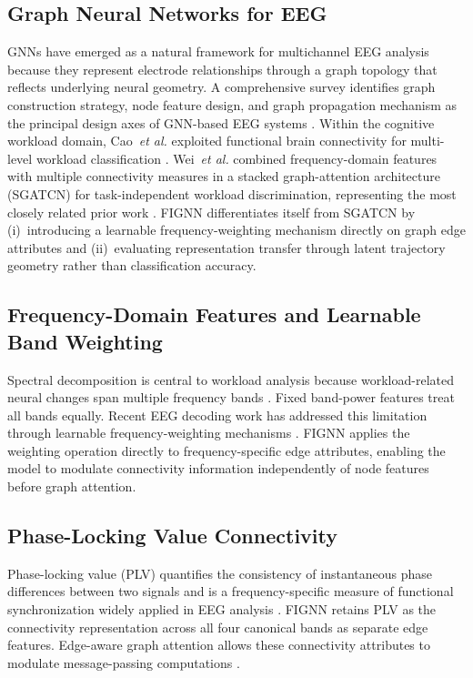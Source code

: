 \documentclass{ieeeaccess}
\begin{document}
\subsection{Graph Neural Networks for EEG}

GNNs have emerged as a natural framework for multichannel EEG analysis because
they represent electrode relationships through a graph topology that reflects
underlying neural geometry. A comprehensive survey identifies graph construction
strategy, node feature design, and graph propagation mechanism as the principal
design axes of GNN-based EEG systems \cite{klepl2024}. Within the cognitive
workload domain, Cao~\emph{et al.} exploited functional brain connectivity for
multi-level workload classification \cite{cao2022}. Wei~\emph{et al.} combined
frequency-domain features with multiple connectivity measures in a stacked
graph-attention architecture (SGATCN) for task-independent workload
discrimination, representing the most closely related prior work \cite{wei2025}.
FIGNN differentiates itself from SGATCN by (i)~introducing a learnable
frequency-weighting mechanism directly on graph edge attributes and
(ii)~evaluating representation transfer through latent trajectory geometry
rather than classification accuracy.

\subsection{Frequency-Domain Features and Learnable Band Weighting}

Spectral decomposition is central to workload analysis because workload-related
neural changes span multiple frequency bands \cite{chikhi2022}. Fixed band-power
features treat all bands equally. Recent EEG decoding work has addressed this
limitation through learnable frequency-weighting mechanisms \cite{ding2025freq}.
FIGNN applies the weighting operation directly to frequency-specific edge
attributes, enabling the model to modulate connectivity information
independently of node features before graph attention.

\subsection{Phase-Locking Value Connectivity}

Phase-locking value (PLV) quantifies the consistency of instantaneous phase
differences between two signals and is a frequency-specific measure of
functional synchronization widely applied in EEG analysis
\cite{lachaux1999}. FIGNN retains PLV as the connectivity representation
across all four canonical bands as separate edge features. Edge-aware graph
attention allows these connectivity attributes to modulate message-passing
computations \cite{velickovic2018}.
\end{document}
